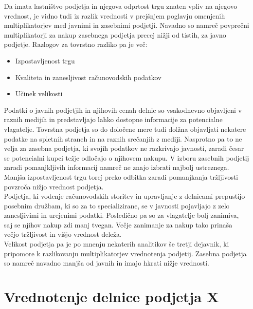 \documentclass[12pt,a4paper]{amsart}
\theoremstyle{definition} %
\theoremstyle{plain} %
\begin{document}
Da imata lastništvo podjetja in njegova odprtost trgu znaten vpliv na njegovo vrednost, je vidno tudi iz razlik vrednosti v prejšnjem poglavju omenjenih multiplikatorjev med javnimi in zasebnimi podjetji. Navadno so namreč povprečni multiplikatorji za nakup zasebnega podjetja precej nižji od tistih, za javno podjetje. Razlogov za tovrstno razliko pa je več:
\begin{itemize}
\item Izpostavljenost trgu
\item Kvaliteta in zanesljivost računovodskih podatkov 
\item Učinek velikosti
\end{itemize}
Podatki o javnih podjetjih in njihovih cenah delnic so vsakodnevno objavljeni v raznih medijih in predstavljajo lahko dostopne informacije za potencialne vlagatelje. Tovrstna podjetja so do določene mere tudi dolžna objavljati nekatere podatke na spletnih straneh in na raznih srečanjih z mediji. Nasprotno pa to ne velja za zasebna podjetja, ki svojih podatkov ne razkrivajo javnosti, zaradi česar se potencialni kupci težje odločajo o njihovem nakupu. V izboru zasebnih podjetij zaradi pomanjkljivih informacij namreč ne znajo izbrati najbolj ustreznega. Manjša izpostavljenost trgu torej preko odbitka zaradi pomanjkanja tržljivosti povzroča nižjo vrednost podjetja.\\
Podjetja, ki vodenje računovodskih storitev in upravljanje z delnicami prepustijo posebnim družbam, ki so za to specializirane, se v javnosti pojavljajo z zelo zanesljivimi in urejenimi podatki. Posledično pa so za vlagatelje bolj zanimiva, saj se njihov nakup zdi manj tvegan. Večje zanimanje za nakup tako prinaša večjo tržljivost in višjo vrednost deleža.\\
Velikost podjetja pa je po mnenju nekaterih analitikov še tretji dejavnik, ki pripomore k razlikovanju multiplikatorjev vrednotenja podjetij. Zasebna podjetja so namreč navadno manjša od javnih in imajo hkrati nižje vrednosti. \\













\section{Vrednotenje delnice podjetja X}
\end{document}
